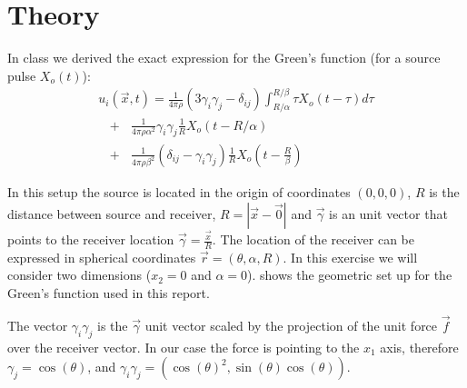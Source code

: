 \section{Theory}

\def\hh{{\boldsymbol{\lambda}} }

In class we derived the exact expression for the Green's function 
(for a source pulse $X_o(t)$):
\begin{equation}
 \begin{split}
  u_{i}(\vec{x},t) = \frac{1}{4\pi\rho}(3\gamma_i \gamma_j-\delta_{ij})   \int_{R/\alpha}^{R/\beta}   {\tau X_{o}(t-\tau)d\tau } \\
     \mbox{  }+\mbox{  } \frac{1}{4\pi\rho\alpha^2} \gamma_i \gamma_j \frac{1}{R} X_o (t-R/\alpha) \\
     \mbox{  }+\mbox{  } \frac{1}{4\pi\rho\beta^2}(\delta_{ij} -\gamma_i \gamma_j)\frac{1}{R} X_o (t - \frac{R}{\beta})
 \end{split}
\label{eq:gf}
\end{equation}

In this setup the source is located in the origin of coordinates $(0,0,0)$, $R$ is the distance
between source and receiver, $R=|\vec{x}-\vec{0}|$ and $\vec{\gamma}$ is an unit vector that points
to the receiver location $\vec{\gamma}=\frac{\vec{x}}{R}$. The location of the receiver can be expressed 
in spherical coordinates $\vec{r}=(\theta,\alpha,R)$. In this exercise we will consider two dimensions 
($x_2=0$ and $\alpha=0$).  shows the geometric set up for the Green's function used in this report.

The vector $\gamma_i \gamma_j$ is the $\vec{\gamma}$ unit vector
scaled by the projection of the unit force $\vec{f}$ over the receiver vector. In our case the force is
pointing to the $x_1$ axis, therefore $\gamma_j= \cos(\theta)$, and $\gamma_i\gamma_j=(\cos(\theta)^2,\sin(\theta)\cos(\theta))$.



